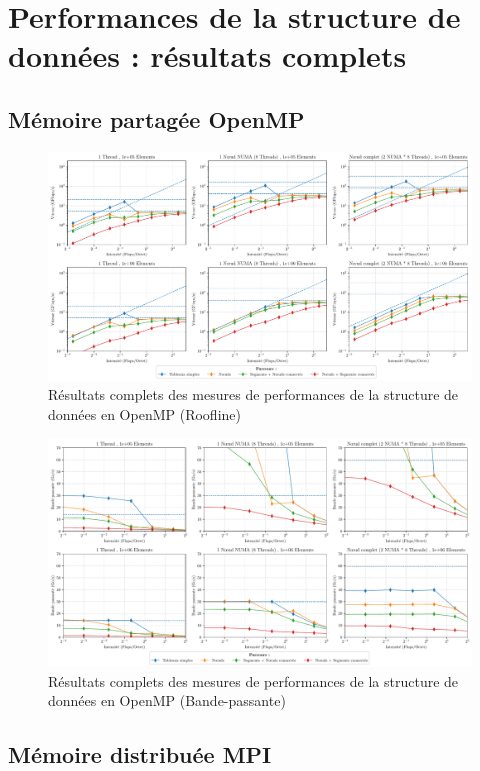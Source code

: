 \section{Performances de la structure de données : résultats complets}

\subsection{Mémoire partagée OpenMP}

\begin{figure}
    \includegraphics[width=\textwidth]{img/bench_mesh_roofline_full.pdf}
    \caption{Résultats complets des mesures de performances de la structure de données en OpenMP (Roofline)}
\end{figure}

\begin{figure}
    \includegraphics[width=\textwidth]{img/bench_mesh_bandwidth_full.pdf}
    \caption{Résultats complets des mesures de performances de la structure de données en OpenMP (Bande-passante)}
\end{figure}

\subsection{Mémoire distribuée MPI}

